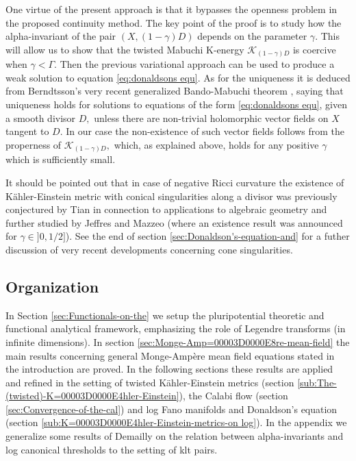 \documentclass[11pt,oneside,english]{amsart}
\numberwithin{equation}{section}
\numberwithin{figure}{section}
\theoremstyle{plain}
\theoremstyle{plain}
\theoremstyle{plain}
\theoremstyle{plain}
\theoremstyle{remark}
\theoremstyle{definition}
\begin{document}
One virtue of the present approach is that it bypasses the openness
problem in the proposed continuity method. The key point of the proof
is to study how the alpha-invariant of the pair $(X,(1-\gamma)D)$
depends on the parameter $\gamma.$ This will allow us to show that
the twisted Mabuchi K-energy $\mathcal{K}_{(1-\gamma)D}$ is coercive
when $\gamma<\Gamma.$ Then the previous variational approach can
be used to produce a weak solution to equation \ref{eq:donaldsons equ}.
As for the uniqueness it is deduced from Berndtsson's very recent
generalized Bando-Mabuchi theorem \cite{bern}, saying that uniqueness
holds for solutions to equations of the form \ref{eq:donaldsons equ},
given a smooth divisor $D,$ unless there are non-trivial holomorphic
vector fields on $X$ tangent to $D.$ In our case the non-existence
of such vector fields follows from the properness of $\mathcal{K}_{(1-\gamma)D},$
which, as explained above, holds for any positive $\gamma$ which
is sufficiently small.

It should be pointed out that in case of negative Ricci curvature
the existence of Kähler-Einstein metric with conical singularities
along a divisor was previously conjectured by Tian \cite{ti3} in
connection to applications to algebraic geometry and further studied
by Jeffres \cite{j} and Mazzeo \cite{ma} (where an existence result
was announced for $\gamma\in]0,1/2]$). See the end of section \ref{sec:Donaldson's-equation-and}
for a futher discussion of very recent developments concerning cone
singularities. 

\subsection*{Organization}

In Section \ref{sec:Functionals-on-the} we setup the pluripotential
theoretic and functional analytical framework, emphasizing the role
of Legendre transforms (in infinite dimensions). In section \ref{sec:Monge-Amp=00003D0000E8re-mean-field}
the main results concerning general Monge-Ampère mean field equations
stated in the introduction are proved. In the following sections these
results are applied and refined in the setting of twisted Kähler-Einstein
metrics (section \ref{sub:The-(twisted)-K=00003D0000E4hler-Einstein}),
the Calabi flow (section \ref{sec:Convergence-of-the-cal}) and log
Fano manifolds and Donaldson's equation (section \ref{sub:K=00003D0000E4hler-Einstein-metrics-on log}).
In the appendix we generalize some results of Demailly on the relation
between alpha-invariants and log canonical thresholds to the setting
of klt pairs.
\end{document}
